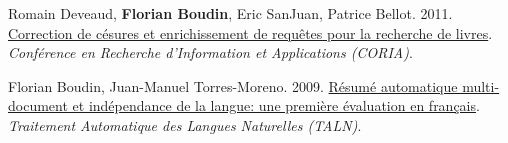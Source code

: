 \item 
Romain Deveaud, \textbf{Florian Boudin}, Eric SanJuan, Patrice Bellot.
2011.
\href{https://asso-aria.org/coria/2011/89.pdf}{Correction de césures et enrichissement de requêtes pour la recherche de livres}.
\textit{Conférence en Recherche d’Information et Applications (CORIA)}.
\label{deveaud-etal-2011-correction}

\item 
Florian Boudin, Juan-Manuel Torres-Moreno.
2009.
\href{https://aclanthology.org/2009.jeptalnrecital-court.35.pdf}{Résumé automatique multi-document et indépendance de la langue: une première évaluation en français}.
\textit{Traitement Automatique des Langues Naturelles (TALN)}.
\label{boudin-torres-moreno-2009-resume}